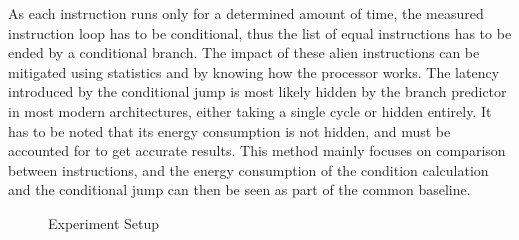 As each instruction runs only for a determined amount of time, the measured
instruction loop has to be conditional, thus the list of equal instructions has
to be ended by a conditional branch. The impact of these alien instructions
can be mitigated using statistics and by knowing how the processor works. The
latency introduced by the conditional jump is most likely hidden by the branch
predictor in most modern architectures, either taking a single cycle or hidden
entirely. It has to be noted that its energy consumption is not hidden, and must
be accounted for to get accurate results. This method mainly focuses on
comparison between instructions, and the energy consumption of the condition
calculation and the conditional jump can then be seen as part of the common
baseline.

\begin{figure}
    
    \caption{Experiment Setup}
    \label{fig:setup}
\end{figure}


